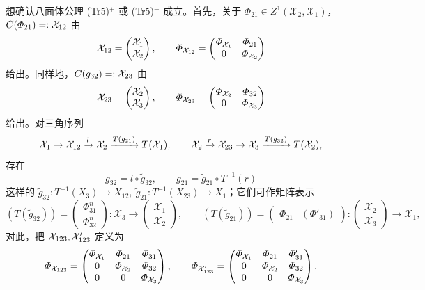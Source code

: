  想确认八面体公理 (Tr5)${}^{+}$ 或 (Tr5)${}^{-}$ 成立。首先，关于 $\varPhi_{21} \in Z^{1}(\mathcal{X}_{2},\mathcal{X}_{1})$，$C(\varPhi_{21}) =: \mathcal{X}_{12}$ 由
\[
  \mathcal{X}_{12} = \begin{pmatrix}\mathcal{X}_{1}\\ \mathcal{X}_{2}\end{pmatrix},
  \qquad
  \varPhi_{\mathcal{X}_{12}} = \begin{pmatrix}\varPhi_{\mathcal{X}_{1}} & \varPhi_{21}\\ 0 & \varPhi_{\mathcal{X}_{2}}\end{pmatrix}
\]
给出。同样地，$C(g_{32}) =: \mathcal{X}_{23}$ 由
\[
  \mathcal{X}_{23} = \begin{pmatrix}\mathcal{X}_{2}\\ \mathcal{X}_{3}\end{pmatrix},
  \qquad
  \varPhi_{\mathcal{X}_{23}} = \begin{pmatrix}\varPhi_{\mathcal{X}_{2}} & \varPhi_{32}\\ 0 & \varPhi_{\mathcal{X}_{3}}\end{pmatrix}
\]
给出。对三角序列
\[
  \mathcal{X}_{1} \to \mathcal{X}_{12} \xrightarrow{l} \mathcal{X}_{2} \xrightarrow{T(g_{21})} T(\mathcal{X}_{1}),
  \qquad
  \mathcal{X}_{2} \xrightarrow{r} \mathcal{X}_{23} \to \mathcal{X}_{3} \xrightarrow{T(g_{32})} T(\mathcal{X}_{2}),
\]
存在
\[
  g_{32} = l\circ\tilde{g}_{32}, \qquad g_{21} = \tilde{g}_{21}\circ T^{-1}(r)
\]
这样的 $\tilde{g}_{32} \colon T^{-1}(X_{3}) \to X_{12},\ \tilde{g}_{21} \colon T^{-1}(X_{23}) \to X_{1}$；它们可作矩阵表示
\[
  (T(\tilde{g}_{32})) = \begin{pmatrix}\varPhi^{n}_{31}\\ \varPhi^{n}_{32}\end{pmatrix} \colon \mathcal{X}_{3} \to \begin{pmatrix}\mathcal{X}_{1}\\ \mathcal{X}_{2}\end{pmatrix},
  \qquad
  (T(\tilde{g}_{21})) = \begin{pmatrix}\varPhi_{21} & (\varPhi'_{31})\end{pmatrix} \colon \begin{pmatrix}\mathcal{X}_{2}\\ \mathcal{X}_{3}\end{pmatrix} \to \mathcal{X}_{1},
\]
对此，把 $\mathcal{X}_{123}, \mathcal{X}'_{123}$ 定义为
\[
  \varPhi_{\mathcal{X}_{123}} =
  \begin{pmatrix}
    \varPhi_{\mathcal{X}_{1}} & \varPhi_{21} & \varPhi_{31}\\
    0 & \varPhi_{\mathcal{X}_{2}} & \varPhi_{32}\\
    0 & 0 & \varPhi_{\mathcal{X}_{3}}
  \end{pmatrix},
  \qquad
  \varPhi_{\mathcal{X}'_{123}} =
  \begin{pmatrix}
    \varPhi_{\mathcal{X}_{1}} & \varPhi_{21} & \varPhi'_{31}\\
    0 & \varPhi_{\mathcal{X}_{2}} & \varPhi_{32}\\
    0 & 0 & \varPhi_{\mathcal{X}_{3}}
  \end{pmatrix}.
\]
